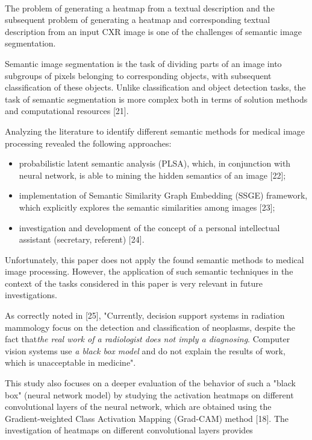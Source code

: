 \documentclass[a4paper]{article}
\begin{document}
\begin{multicols}{2}
\normalsize\\
The problem of generating a heatmap from a textual
description and the subsequent problem of generating a
heatmap and corresponding textual description from an
input CXR image is one of the challenges of semantic
image segmentation.\par
Semantic image segmentation is the task of dividing
parts of an image into subgroups of pixels belonging to
corresponding objects, with subsequent classification of
these objects. Unlike classification and object detection
\columnbreak
tasks, the task of semantic segmentation is more complex
both in terms of solution methods and computational
resources [21].\par
Analyzing the literature to identify different semantic
methods for medical image processing revealed the following approaches:
\begin{itemize}[noitemsep]
    \item probabilistic latent semantic analysis (PLSA), which, in conjunction with neural network, is able to mining the hidden semantics of an image [22];
    \item implementation of Semantic Similarity Graph Embedding (SSGE) framework, which explicitly explores the semantic similarities among images [23];
    \item investigation and development of the concept of a personal intellectual assistant (secretary, referent) [24].
\end{itemize}\par
  Unfortunately, this paper does not apply the found
semantic methods to medical image processing. However,
the application of such semantic techniques in the context
of the tasks considered in this paper is very relevant in
future investigations.\par
As correctly noted in [25], "Currently, decision support systems in radiation mammology focus on the detection and classification of neoplasms, despite the
fact that{\it the real work of a radiologist does not imply
a diagnosing}. Computer vision systems use {\it a black box
model} and do not explain the results of work, which is
unacceptable in medicine".\par
This study also focuses on a deeper evaluation of
the behavior of such a "black box" (neural network
model) by studying the activation heatmaps on different
convolutional layers of the neural network, which are
obtained using the Gradient-weighted Class Activation
Mapping (Grad-CAM) method [18]. The investigation
of heatmaps on different convolutional layers provides

\end{multicols}
\end{document}
